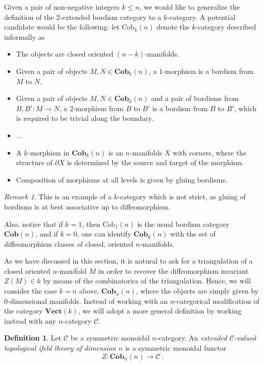 \documentclass[a4paper,11pt]{article}
\newcommand{\ccal}{\mathcal{C}}
\newcommand{\vecto}{\mathbf{Vect}}
\theoremstyle{plain}
\theoremstyle{definition}
\newtheorem{defi}[thm]{Definition}
\theoremstyle{remark}
\newtheorem*{rem}{Remark}
\begin{document}
Given a pair of non-negative integers $k \leq n$, we would like to generalize the definition of the 2-extended bordism category to a $k$-category. A potential candidate would be the following: let $\text{Cob}_k(n)$ denote the $k$-category described informally as 
\begin{itemize}
    \item The objects are closed oriented $(n-k)$-manifolds.
    \item Given a pair of objects $M, N \in \textbf{Cob}_k(n)$, a 1-morphism is a bordism from $M$ to $N$.
    \item Given a pair of objects $M, N \in \textbf{Cob}_k(n)$ and a pair of bordisms from $B, B' \colon M \to N$, a 2-morphism from $B$ to $B'$ is a bordism from $B$ to $B'$, which is required to be trivial along the boundary.
    \item ...
    \item A $k$-morphism in $\textbf{Cob}_k(n)$ is an $n$-manifolds $X$ with corners, where the structure of $\partial X$ is determined by the source and target of the morphism.
    \item Composition of morphisms at all levels is given by gluing bordisms.
\end{itemize}

\begin{rem}
This is an example of a $k$-category which is not strict, as gluing of bordisms is at best associative up to diffeomorphism. 

Also, notice that if $k = 1$, then $\text{Cob}_1(n)$ is the usual bordism category $\textbf{Cob}(n)$, and if $k = 0$, one can identify $\textbf{Cob}_k(n)$ with the set of diffeomorphism classes of closed, oriented $n$-manifolds. 
\end{rem}


As we have discussed in this section, it is natural to ask for a triangulation of a closed oriented $n$-manifold $M$ in order to recover the diffeomorphism invariant $Z(M) \in k$ by means of the combinatorics of the triangulation. Hence, we will consider the case $k = n$ above, $\textbf{Cob}_n(n)$, where the objects are simply given by $0$-dimensional manifolds. Instead of working with an $n$-categorical modification of the category $\vecto(k)$, we will adopt a more general definition by working instead with any $n$-category $\ccal$. 

\begin{defi}
\label{extended_tft}
Let $\ccal$ be a symmetric monoidal $n$-category. An \textit{extended $\ccal$-valued topological ifeld theory of dimension $n$} is a symmetric monoidal functor 
$$Z \colon \textbf{Cob}_n(n) \to \ccal \, .$$
\end{defi}
\end{document}
